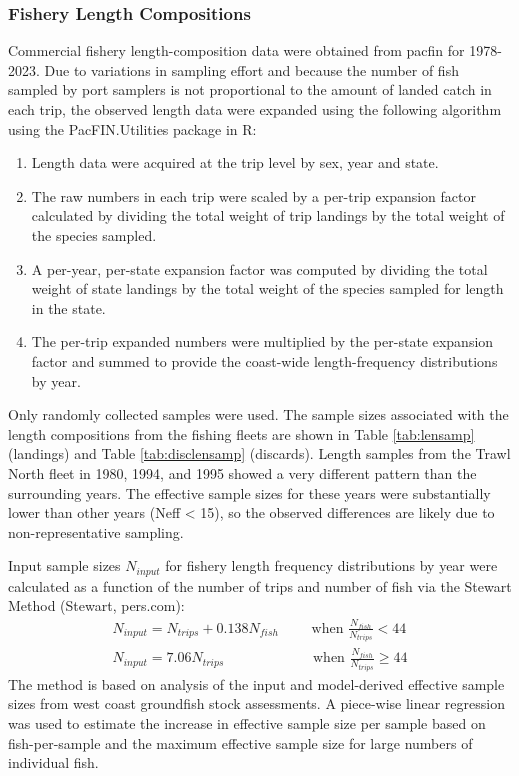 \documentclass[11pt,
  english,
  letterpaper,
]{article}
\providecommand{\tightlist}{%
  \setlength{\itemsep}{0pt}\setlength{\parskip}{0pt}}
\providecommand{\tightlist}{%
  \setlength{\itemsep}{0pt}\setlength{\parskip}{0pt}}
\begin{document}
\hypertarget{fishery-length-compositions}{%
\subsubsection{Fishery Length Compositions}\label{fishery-length-compositions}}

Commercial fishery length-composition data were obtained from \gls{pacfin} for 1978-2023. Due to variations in sampling effort and because the number of fish sampled by port samplers is not proportional to the amount of landed catch in each trip, the observed length data were expanded using the following algorithm using the PacFIN.Utilities package in R:

\begin{enumerate}
\def\labelenumi{\arabic{enumi}.}
\tightlist
\item
  Length data were acquired at the trip level by sex, year and state.
\item
  The raw numbers in each trip were scaled by a per-trip expansion factor calculated by dividing the total weight of trip landings by the total weight of the species sampled.
\item
  A per-year, per-state expansion factor was computed by dividing the total weight of state landings by the total weight of the species sampled for length in the state.
\item
  The per-trip expanded numbers were multiplied by the per-state expansion factor and summed to provide the coast-wide length-frequency distributions by year.
\end{enumerate}

Only randomly collected samples were used. The sample sizes associated with the length compositions from the fishing fleets are shown in Table \ref{tab:lensamp} (landings) and Table \ref{tab:disclensamp} (discards). Length samples from the Trawl North fleet in 1980, 1994, and 1995 showed a very different pattern than the surrounding years. The effective sample sizes for these years were substantially lower than other years (Neff \textless{} 15), so the observed differences are likely due to non-representative sampling.

Input sample sizes \({N_{input}}\) for fishery length frequency distributions by year were calculated as a function of the number of trips and number of fish via the Stewart Method (Stewart, pers.com): \begin{align*}{N_{input} = N_{trips} + 0.138N_{fish}}\qquad\text{ when }\frac{N_{fish}}{N_{trips}}<44 \\
{N_{input} = 7.06N_{trips}}\qquad\qquad\qquad\text{ when }\frac{N_{fish}}{N_{trips}}\ge 44 \end{align*} The method is based on analysis of the input and model-derived effective sample sizes from west coast groundfish stock assessments. A piece-wise linear regression was used to estimate the increase in effective sample size per sample based on fish-per-sample and the maximum effective sample size for large numbers of individual fish.
\end{document}
